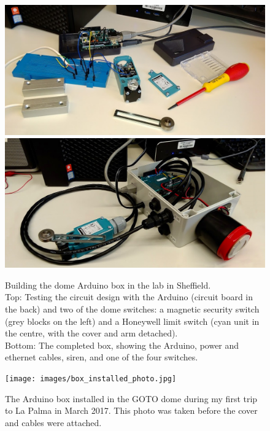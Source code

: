 \begin{colsection}
\begin{colsection}
\begin{figure}[p]
    \begin{center}
        \includegraphics[width=\textwidth]{images/arduino_photo.jpg}
        \includegraphics[width=\textwidth]{images/box_photo.jpg}
    \end{center}
    \caption[Building the dome Arduino box]{
        Building the dome Arduino box in the lab in Sheffield.\\
        Top: Testing the circuit design with the Arduino (circuit board in the back) and two of the dome switches: a magnetic security switch (grey blocks on the left) and a Honeywell limit switch (cyan unit in the centre, with the cover and arm detached).\\
        Bottom: The completed box, showing the Arduino, power and ethernet cables, siren, and one of the four switches.
    }\label{fig:arduino_wip}
\end{figure}

\newpage

\begin{figure}[p]
    \begin{center}
        \texttt{[image: images/box\_installed\_photo.jpg]}
    \end{center}
    \caption[The Arduino box installed in the GOTO dome]{
        The Arduino box installed in the GOTO dome during my first trip to La Palma in March 2017. This photo was taken before the cover and cables were attached.
    }\label{fig:arduino_installed}
\end{figure}


\end{colsection}
\end{colsection}
